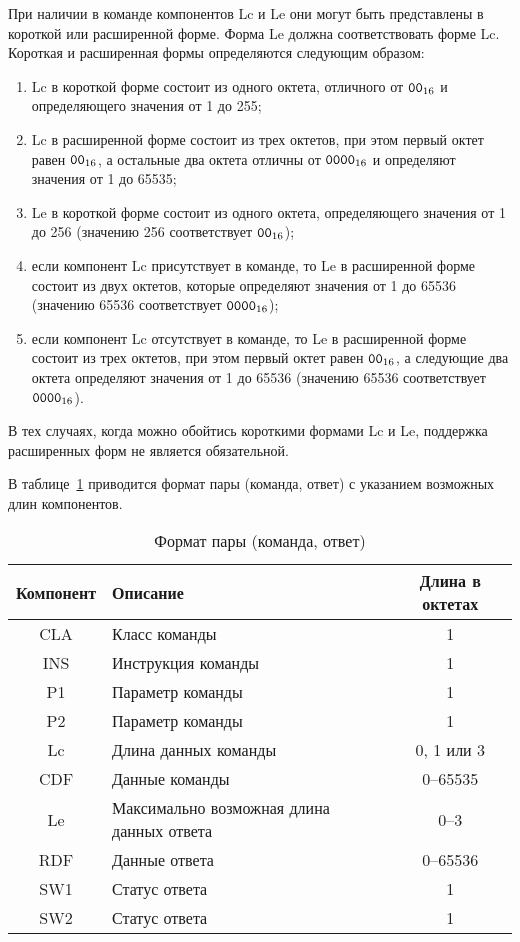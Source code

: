 При наличии в команде компонентов Lc и Le они могут быть представлены 
в короткой или расширенной форме. Форма Le должна соответствовать форме Lc. 
%
Короткая и расширенная формы определяются следующим образом: 
\begin{enumerate}
\item[1)]
Lc в короткой форме состоит из одного октета, отличного от $\texttt{00}_{16}$ и 
определяющего значения от 1 до 255; 

\item[2)] 
Lc в расширенной форме состоит из трех октетов, при этом первый октет 
равен $\texttt{00}_{16}$, а остальные два октета отличны от 
$\texttt{0000}_{16}$ и определяют значения от 1 до 65535; 

\item[3)] 
Le в короткой форме состоит из одного октета, определяющего значения 
от 1 до 256 (значению 256 соответствует $\texttt{00}_{16}$); 

\item[4)] 
если компонент Lc присутствует в команде, то Le в расширенной форме 
состоит из двух октетов, которые определяют значения от 1 до 65536 
(значению 65536 соответствует $\texttt{0000}_{16}$); 

\item[5)] 
если компонент Lc отсутствует в команде, то Le в расширенной форме 
состоит из трех октетов, при этом первый октет равен $\texttt{00}_{16}$,
а следующие два октета определяют значения от 1 до 65536
(значению 65536 соответствует $\texttt{0000}_{16}$).
\end{enumerate}

В тех случаях, когда можно обойтись короткими формами Lc и Le, 
поддержка расширенных форм не является обязательной.

В таблице~\ref{Table.CMDS.Fmt} приводится формат пары (команда, ответ) 
с указанием возможных длин компонентов.

\begin{table}[h]
\caption{Формат пары (команда, ответ)}\label{Table.CMDS.Fmt}
\begin{tabular}{|c|p{10.5cm}|c|}
\hline
Компонент & Описание & Длина в октетах \\
\hline
\hline
CLA & Класс команды & 1 \\
\hline
INS & Инструкция команды & 1 \\
\hline
P1 & Параметр команды & 1 \\
\hline
P2 & Параметр команды & 1 \\
\hline
Lc & Длина данных команды & 0, 1 или 3  \\
\hline
CDF & Данные команды & 0--65535 \\
\hline
Le & Максимально возможная длина данных ответа & 0--3 
\\
\hline
RDF & Данные ответа & 0--65536 \\
\hline
SW1 & Статус ответа & 1 \\
\hline
SW2 & Статус ответа & 1 \\
\hline
\end{tabular}
\end{table}

